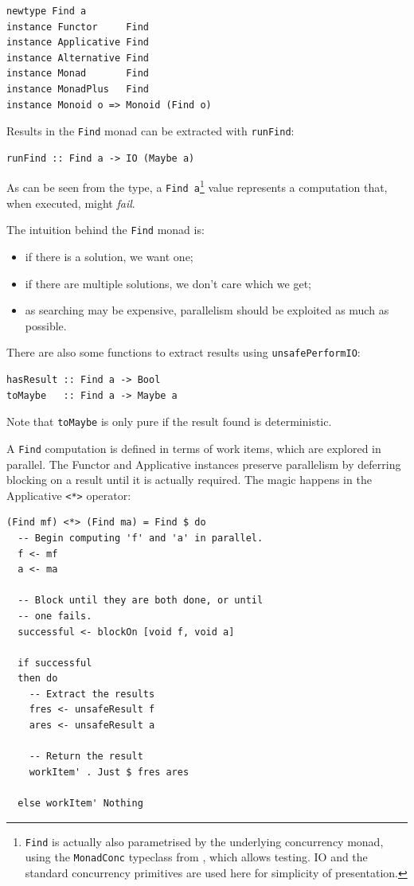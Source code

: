 \begin{verbatim}
newtype Find a
instance Functor     Find
instance Applicative Find
instance Alternative Find
instance Monad       Find
instance MonadPlus   Find
instance Monoid o => Monoid (Find o)
\end{verbatim}

Results in the \verb|Find| monad can be extracted with \verb|runFind|:

\begin{verbatim}
runFind :: Find a -> IO (Maybe a)
\end{verbatim}

As can be seen from the type, a \verb|Find a|\footnote{\texttt{Find}
  is actually also parametrised by the underlying concurrency monad,
  using the \texttt{MonadConc} typeclass from \dejafu{}\cite{dejafu},
  which allows testing. IO and the standard concurrency primitives are
  used here for simplicity of presentation.} value represents a
computation that, when executed, might \textit{fail}.

The intuition behind the \verb|Find| monad is:

\begin{itemize}
  \item if there is a solution, we want one;

  \item if there are multiple solutions, we don't care which we get;

  \item as searching may be expensive, parallelism should be exploited
    as much as possible.
\end{itemize}

There are also some functions to extract results using
\verb|unsafePerformIO|:

\begin{verbatim}
hasResult :: Find a -> Bool
toMaybe   :: Find a -> Maybe a
\end{verbatim}

Note that \verb|toMaybe| is only pure if the result found is
deterministic.

A \verb|Find| computation is defined in terms of work items, which are
explored in parallel. The Functor and Applicative instances preserve
parallelism by deferring blocking on a result until it is actually
required. The magic happens in the Applicative \verb|<*>| operator:

\begin{verbatim}
(Find mf) <*> (Find ma) = Find $ do
  -- Begin computing 'f' and 'a' in parallel.
  f <- mf
  a <- ma

  -- Block until they are both done, or until
  -- one fails.
  successful <- blockOn [void f, void a]

  if successful
  then do
    -- Extract the results
    fres <- unsafeResult f
    ares <- unsafeResult a

    -- Return the result
    workItem' . Just $ fres ares

  else workItem' Nothing
\end{verbatim}


